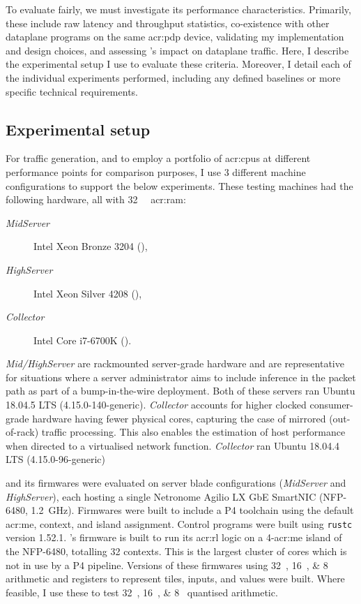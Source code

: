 To evaluate \approachshort{} fairly, we must investigate its performance characteristics.
Primarily, these include raw latency and throughput statistics, co-existence with other dataplane programs on the same \gls{acr:pdp} device, validating my implementation and design choices, and assessing \approachshort{}'s impact on dataplane traffic.
Here, I describe the experimental setup I use to evaluate these criteria.
Moreover, I detail each of the individual experiments performed, including any defined baselines or more specific technical requirements.

\subsection{Experimental setup}\label{sec:experimental-setup}
For traffic generation, and to employ a portfolio of \glspl{acr:cpu} at different performance points for comparison purposes, I use 3 different machine configurations to support the below experiments.
These testing machines had the following hardware, all with \qty{32}{\gibi\byte} \gls{acr:ram}:
\begin{description}
	\item[\emph{MidServer}] Intel Xeon Bronze 3204 (),
	\item[\emph{HighServer}] Intel Xeon Silver 4208 (),
	\item[\emph{Collector}] Intel Core i7-6700K ().
\end{description}
\emph{Mid/HighServer} are rackmounted server-grade hardware and are representative for situations where a server administrator aims to include inference in the packet path as part of a bump-in-the-wire deployment.
Both of these servers ran Ubuntu 18.04.5 LTS (4.15.0-140-generic).
\emph{Collector} accounts for higher clocked consumer-grade hardware having fewer physical cores, capturing the case of mirrored (out-of-rack) traffic processing.
This also enables the estimation of host performance when directed to a virtualised network function.
\emph{Collector} ran Ubuntu 18.04.4 LTS (4.15.0-96-generic)

\approachshort{} and its firmwares were evaluated on server blade configurations (\emph{MidServer} and \emph{HighServer}), each hosting a single Netronome Agilio LX GbE SmartNIC (NFP-6480, \qty{1.2}{\giga\hertz}).
Firmwares were built to include a P4 toolchain using the default \gls{acr:me}, context, and island assignment.
Control programs were built using \texttt{rustc} version 1.52.1.
\approachshort{}'s firmware is built to run its \gls{acr:rl} logic on a \num{4}-\gls{acr:me} island of the NFP-6480, totalling \num{32} contexts.
This is the largest cluster of cores which is not in use by a P4 pipeline.
Versions of these firmwares using \qtylist{32;16;8}{\bit} arithmetic and registers to represent tiles, inputs, and values were built.
Where feasible, I use these to test \qtylist{32;16;8}{\bit} quantised arithmetic.

